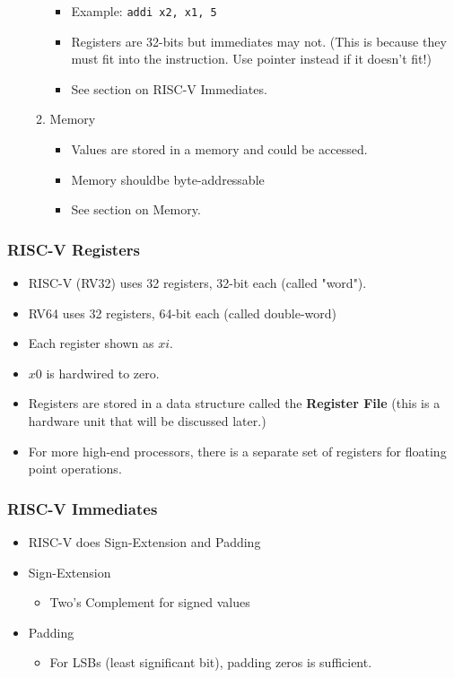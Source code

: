 \documentclass[10pt]{article}
\begin{document}
\begin{itemize}
\begin{enumerate}
\begin{itemize}
            \item Example: \texttt{addi x2, x1, 5}
            \item Registers are 32-bits but immediates may not.  (This is because they must fit into the instruction.  Use pointer instead if it doesn't fit!)
            \item See section on RISC-V Immediates.
        \end{itemize}
        \item Memory
        \begin{itemize}
            \item Values are stored in a memory and could be accessed.
            \item Memory shouldbe byte-addressable
            \item See section on Memory.
        \end{itemize}
    \end{enumerate}
\end{itemize}
\subsubsection*{RISC-V Registers}
\begin{itemize}
    \item RISC-V (RV32) uses 32 registers, 32-bit each (called "word").
    \item RV64 uses 32 registers, 64-bit each (called double-word)
    \item Each register shown as $xi$.
    \item $x0$ is hardwired to zero.
    \item Registers are stored in a data structure called the \textbf{Register File} (this is a hardware unit that will be discussed later.)
    \item For more high-end processors, there is a separate set of registers for floating point operations.
\end{itemize}
\subsubsection*{RISC-V Immediates}
\begin{itemize}
    \item RISC-V does Sign-Extension and Padding
    \item Sign-Extension
    \begin{itemize}
        \item Two's Complement for signed values
    \end{itemize}
    \item Padding
    \begin{itemize}
        \item For LSBs (least significant bit), padding zeros is sufficient.
    \end{itemize}
\end{itemize}
\end{document}
